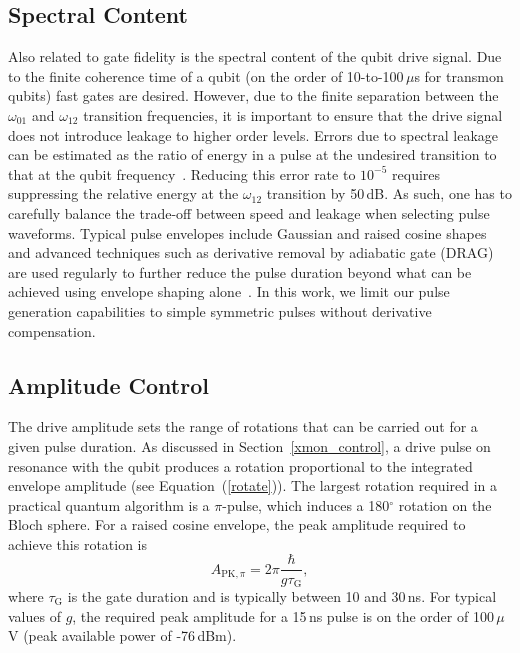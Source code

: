 \documentclass[journal]{IEEEtran}
\newcommand{\CR}[1]{{\color{black}#1}}
\begin{document}
\subsection{Spectral Content}
Also related to gate fidelity is the spectral content of the qubit drive signal. Due to the finite coherence time of a qubit (on the order of 10-to-100\,$\mu$s for transmon qubits) fast gates are desired. However, due to the finite separation between the $\omega_\text{01}$ and $\omega_\text{12}$ transition frequencies, it is important to ensure that the drive signal does not introduce leakage to higher order levels. \CR{Errors due to spectral leakage can be estimated as the ratio of energy in a pulse at the undesired transition to that at the qubit frequency~\cite{steffen2003accurate}. Reducing this error rate to $10^{-5}$ requires suppressing the relative energy at the $\omega_\text{12}$ transition by 50\,dB. As such, one has to carefully balance the trade-off between speed and leakage when selecting pulse waveforms}. Typical pulse envelopes include Gaussian and raised cosine shapes and advanced techniques such as derivative removal by adiabatic gate (DRAG) are used regularly to further reduce the pulse duration beyond what can be achieved using envelope shaping alone~\cite{motzoi2009simple,gambetta2011analytic}. In this work, we limit our pulse generation capabilities to simple symmetric pulses without derivative compensation. 


\subsection{Amplitude Control}
The drive amplitude sets the range of rotations that can be carried out for a given pulse duration. As discussed in Section~\ref{xmon_control}, a drive pulse on resonance with the qubit produces a rotation proportional to the integrated envelope amplitude (see Equation~(\ref{rotate})). The largest rotation required in a practical quantum algorithm is a $\pi$-pulse, \CR{which induces a 180$^\circ$ rotation on the Bloch sphere}. For a raised cosine envelope, the  peak amplitude required to achieve this rotation is
\begin{equation}
A_{\text{PK},\pi}=2\pi\frac{\hbar}{g\tau_\text{G}},
\end{equation}
\CR{where $\tau_\text{G}$ is the gate duration and is typically between 10 and 30\,ns.} For typical values of $g$, the required peak amplitude for a 15\,ns pulse is on the order of 100\,$\mu$V (peak available power of -76\,dBm). 
\end{document}
